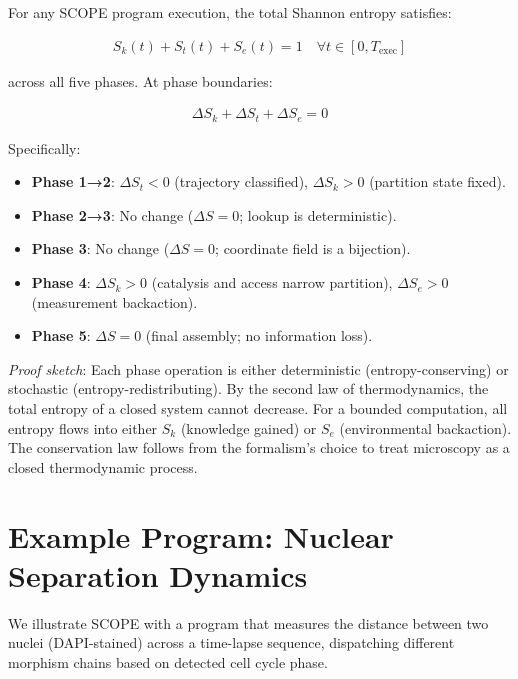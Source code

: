 \documentclass[11pt,twocolumn]{article}
\begin{document}
\begin{theorem}
\label{thm:entropy}
For any SCOPE program execution, the total Shannon entropy satisfies:

\begin{align}
S_k(t) + S_t(t) + S_e(t) = 1 \quad \forall t \in [0, T_{\text{exec}}]
\end{align}

\noindent across all five phases. At phase boundaries:

\begin{align}
\Delta S_k + \Delta S_t + \Delta S_e = 0
\end{align}

Specifically:
\begin{itemize}
\item \textbf{Phase 1→2}: $\Delta S_t < 0$ (trajectory classified), $\Delta S_k > 0$ (partition state fixed).
\item \textbf{Phase 2→3}: No change ($\Delta S = 0$; lookup is deterministic).
\item \textbf{Phase 3}: No change ($\Delta S = 0$; coordinate field is a bijection).
\item \textbf{Phase 4}: $\Delta S_k > 0$ (catalysis and access narrow partition), $\Delta S_e > 0$ (measurement backaction).
\item \textbf{Phase 5}: $\Delta S = 0$ (final assembly; no information loss).
\end{itemize}
\end{theorem}

\textit{Proof sketch}: Each phase operation is either deterministic (entropy-conserving) or stochastic (entropy-redistributing). By the second law of thermodynamics, the total entropy of a closed system cannot decrease. For a bounded computation, all entropy flows into either $S_k$ (knowledge gained) or $S_e$ (environmental backaction). The conservation law follows from the formalism's choice to treat microscopy as a closed thermodynamic process.

\section{Example Program: Nuclear Separation Dynamics}

We illustrate SCOPE with a program that measures the distance between two nuclei (DAPI-stained) across a time-lapse sequence, dispatching different morphism chains based on detected cell cycle phase.
\end{document}
